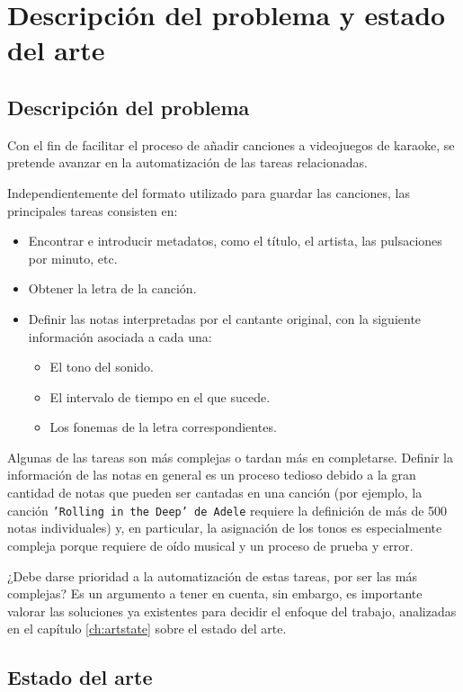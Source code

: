 \chapter{Descripción del problema y estado del arte}

\section{Descripción del problema}

Con el fin de facilitar el proceso de añadir canciones a videojuegos de karaoke, se pretende avanzar en la automatización de las tareas relacionadas.

Independientemente del formato utilizado para guardar las canciones, las principales tareas consisten en:

\begin{itemize}
	\item{Encontrar e introducir metadatos, como el título, el artista, las pulsaciones por minuto, etc.}
	\item{Obtener la letra de la canción.}
	\item{Definir las notas interpretadas por el cantante original, con la siguiente información asociada a cada una:}
	\begin{itemize}
		\item{El tono del sonido.}
		\item{El intervalo de tiempo en el que sucede.}
		\item{Los fonemas de la letra correspondientes.}
	\end{itemize}
\end{itemize}

Algunas de las tareas son más complejas o tardan más en completarse. Definir la información de las notas en general es un proceso tedioso debido a la gran cantidad de notas que pueden ser cantadas en una canción (por ejemplo, la canción \texttt{'Rolling in the Deep' de Adele} requiere la definición de más de 500 notas individuales) y, en particular, la asignación de los tonos es especialmente compleja porque requiere de oído musical y un proceso de prueba y error.

¿Debe darse prioridad a la automatización de estas tareas, por ser las más complejas? Es un argumento a tener en cuenta, sin embargo, es importante valorar las soluciones ya existentes para decidir el enfoque del trabajo, analizadas en el capítulo \ref{ch:artstate} sobre el estado del arte.

\section{Estado del arte}

